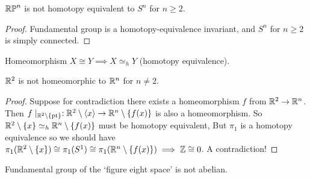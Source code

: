 \documentclass[12pt]{amsart}
\begin{document}
\begin{corollary}
    $\mathbb{RP}^n$ is not homotopy equivalent to $S^n$ for $n \geq 2$. 
\end{corollary}

\begin{proof}
    Fundamental group is a homotopy-equivalence invariant, and $S^n$ for $n \geq 2$ is simply connected. 
\end{proof}

\begin{remark}
    Homeomorphism $X \cong Y \implies X \simeq_h Y$ (homotopy equivalence). 
\end{remark}

\begin{theorem}
    $\mathbb R^2$ is not homeomorphic to $\mathbb R^n$ for $n \neq 2$. 
\end{theorem}

\begin{proof}

     Suppose for contradiction there exists a homeomorphism $f$ from $\mathbb R^2 \to \mathbb R^n$. Then $f\mid_{\mathbb R^2 \setminus \{\text{pt}\}}: \mathbb R^2 \setminus \langle x \rangle \to \mathbb R^n \setminus\{f(x)\}$ is also a homeomorphism. So $\mathbb R^2 \setminus \{ x \} \simeq_h \mathbb R^n \setminus \{f(x)\}$ must be homotopy equivalent, But $\pi_1$ is a homotopy equivalence so we should have $\pi_1(\mathbb R^2 \setminus \{x\}) \cong \pi_1(S^1) \cong \pi_1 (\mathbb R^n \setminus \{f(x)\}) \implies \mathbb Z \cong 0$. A contradiction!  
\end{proof}

\begin{theorem}
    Fundamental group of the `figure eight space' is not abelian. 
\end{theorem}
\end{document}
